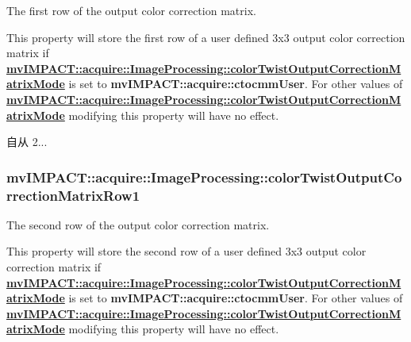 The first row of the output color correction matrix. 

This property will store the first row of a user defined 3x3 output color correction matrix if {\bfseries \hyperlink{classmv_i_m_p_a_c_t_1_1acquire_1_1_image_processing_a9c592b9bee390d8f918b0ef837604fae}{mv\+I\+M\+P\+A\+C\+T\+::acquire\+::\+Image\+Processing\+::color\+Twist\+Output\+Correction\+Matrix\+Mode}} is set to {\bfseries mv\+I\+M\+P\+A\+C\+T\+::acquire\+::ctocmm\+User}. For other values of {\bfseries \hyperlink{classmv_i_m_p_a_c_t_1_1acquire_1_1_image_processing_a9c592b9bee390d8f918b0ef837604fae}{mv\+I\+M\+P\+A\+C\+T\+::acquire\+::\+Image\+Processing\+::color\+Twist\+Output\+Correction\+Matrix\+Mode}} modifying this property will have no effect.

\begin{DoxySince}{自从}
2... 
\end{DoxySince}
\hypertarget{classmv_i_m_p_a_c_t_1_1acquire_1_1_image_processing_a75cccfd023c20569ff5ff6e3e522595a}{
\subsubsection[{color\+Twist\+Output\+Correction\+Matrix\+Row1}]{ mv\+I\+M\+P\+A\+C\+T\+::acquire\+::\+Image\+Processing\+::color\+Twist\+Output\+Correction\+Matrix\+Row1}}\label{classmv_i_m_p_a_c_t_1_1acquire_1_1_image_processing_a75cccfd023c20569ff5ff6e3e522595a}


The second row of the output color correction matrix. 

This property will store the second row of a user defined 3x3 output color correction matrix if {\bfseries \hyperlink{classmv_i_m_p_a_c_t_1_1acquire_1_1_image_processing_a9c592b9bee390d8f918b0ef837604fae}{mv\+I\+M\+P\+A\+C\+T\+::acquire\+::\+Image\+Processing\+::color\+Twist\+Output\+Correction\+Matrix\+Mode}} is set to {\bfseries mv\+I\+M\+P\+A\+C\+T\+::acquire\+::ctocmm\+User}. For other values of {\bfseries \hyperlink{classmv_i_m_p_a_c_t_1_1acquire_1_1_image_processing_a9c592b9bee390d8f918b0ef837604fae}{mv\+I\+M\+P\+A\+C\+T\+::acquire\+::\+Image\+Processing\+::color\+Twist\+Output\+Correction\+Matrix\+Mode}} modifying this property will have no effect.

